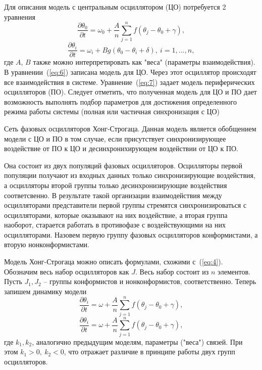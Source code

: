 \documentclass[14pt, russian]{scrartcl}
\begin{document}
Для описания модель с центральным осциллятором (ЦО) потребуется 2 уравнения
\begin{equation}\label{eq:6}
    \frac{\partial \theta_0}{\partial t} = \omega_0 + \frac{A}{n} \sum_{j = 1}^{n}f(\theta_j - \theta_0 + \gamma),
\end{equation}
\begin{equation}\label{eq:7}
    \frac{\partial \theta_i}{\partial t} = \omega_i + B g(\theta_0 - \theta_i + \delta), \ i = 1,...,n,
\end{equation}где $A$, $B$ также можно интерпретировать как "веса" (параметры взаимодействия).
В уравнении~(\ref{eq:6}) записана модель для ЦО. Через этот осциллятор происходят все взаимодействия в системе. Уравнение~(\ref{eq:7}) задает модель периферических осцилляторов (ПО).
Следует отметить, что полученная модель для ЦО и ПО дает возможность выполнять подбор параметров для достижения определенного режима работы системы (полная или частичная синхронизация с ЦО)

Сеть фазовых осцилляторов Хонг-Строгаца. Данная модель является обобщением модели с ЦО и ПО в том случае, если присутствует синхронизирующее воздействие от ПО к ЦО и десинхронихирующем воздействии от ЦО к ПО.

Она состоит из двух популяций фазовых осцилляторов. Осцилляторы первой популяции получают из входных данных только синхронизирующие воздействия,
 а осцилляторы второй группы только десинхронизирующие воздействия соответсвенно. В результате такой организации взаимодействия между осцилляторами представители первой группы стремятся синхронизироваться с осцилляторами, которые оказывают на них воздействие, а вторая группа наоборот, старается работать в противофазе с воздействующими на них осцилляторами. Назовем первую группу фазовых осцилляторов конформистами, а вторую нонконформистами.

Модель Хонг-Строгаца можно описать формулами, схожими с~(\ref{eq:4}). Обозначим весь набор осцилляторов как $J$. Весь набор состоит из $n$ элементов. Пусть $J_1, J_2$ -- группы конформистов и нонконформистов, соответственно. Теперь запишем динамику модели
\begin{equation}\label{eq:8}
    \frac{\partial \theta_i}{\partial t} = \omega + \frac{A}{n} \sum_{j = 1}^{n}f(\theta_j - \theta_0 + \gamma),
\end{equation}
\begin{equation}\label{eq:8}
    \frac{\partial \theta_i}{\partial t} = \omega + \frac{A}{n} \sum_{j = 1}^{n}f(\theta_j - \theta_0 + \gamma),
\end{equation}где $k_1, k_2$, аналогично предыдущим моделям, параметры ("веса") связей. При этом $k_1 > 0,\ k_2 < 0$, что отражает различие в принципе работы двух групп осцилляторов.
\end{document}

